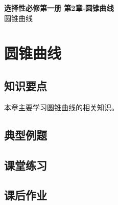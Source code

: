 \documentclass[12pt,a4paper]{article}
\begin{document}
\begin{center}
\LARGE\textbf{选择性必修第一册 第2章-圆锥曲线} \\[0.5em]
\large 圆锥曲线
\end{center}

\tableofcontents
\newpage

\section{圆锥曲线}

\subsection{知识要点}
本章主要学习圆锥曲线的相关知识。

\subsection{典型例题}

\subsection{课堂练习}

\subsection{课后作业}
\end{document}

